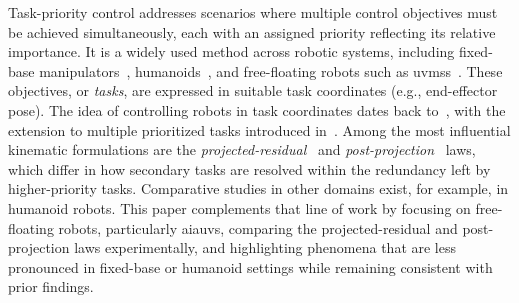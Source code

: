 \documentclass[../main.tex]{subfiles}
\begin{document}
Task-priority control addresses scenarios where multiple control objectives must be achieved simultaneously, each with an assigned priority reflecting its relative importance. It is a widely used method across robotic systems, including fixed-base manipulators~\cite{nakamura1987}, humanoids~\cite{mistry2008}, and free-floating robots such as \glspl{uvms}~\cite{antonelli1998}. These objectives, or \emph{tasks}, are expressed in suitable task coordinates (e.g., end-effector pose). The idea of controlling robots in task coordinates dates back to~\cite{whitney1969}, with the extension to multiple prioritized tasks introduced in~\cite{nakamura1987}. Among the most influential kinematic formulations are the \emph{projected-residual}~\cite{nakamura1987} and \emph{post-projection}~\cite{chiaverini1997} laws, which differ in how secondary tasks are resolved within the redundancy left by higher-priority tasks. Comparative studies in other domains exist, for example, \cite{baerlocher1998} in humanoid robots. This paper complements that line of work by focusing on free-floating robots, particularly \glspl{aiauv}, comparing the projected-residual and post-projection laws experimentally, and highlighting phenomena that are less pronounced in fixed-base or humanoid settings while remaining consistent with prior findings. 


\end{document}

